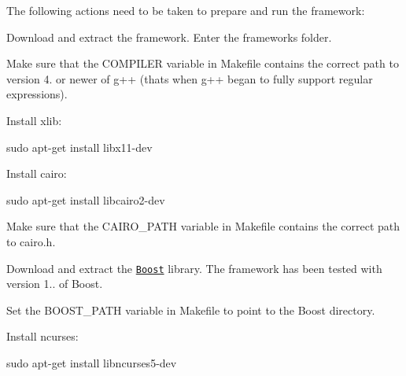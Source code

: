 The following actions need to be taken to prepare and run the framework\+:
\begin{DoxyEnumerate}
\item Download and extract the framework. Enter the framework\textquotesingle{}s folder.
\item Make sure that the {\ttfamily C\+O\+M\+P\+I\+L\+ER} variable in {\ttfamily Makefile} contains the correct path to version 4. or newer of {\ttfamily g++} (that\textquotesingle{}s when {\ttfamily g++} began to fully support regular expressions).
\item Install {\ttfamily xlib}\+: \begin{DoxyVerb}sudo apt-get install libx11-dev
\end{DoxyVerb}

\item Install {\ttfamily cairo}\+: \begin{DoxyVerb}sudo apt-get install libcairo2-dev
\end{DoxyVerb}

\item Make sure that the {\ttfamily C\+A\+I\+R\+O\+\_\+\+P\+A\+TH} variable in {\ttfamily Makefile} contains the correct path to {\ttfamily cairo.\+h}.
\item Download and extract the \href{http://www.boost.org/users/download/}{\tt Boost} library. The framework has been tested with version 1.. of Boost.
\item Set the {\ttfamily B\+O\+O\+S\+T\+\_\+\+P\+A\+TH} variable in {\ttfamily Makefile} to point to the {\ttfamily Boost} directory.
\item Install {\ttfamily ncurses}\+: \begin{DoxyVerb}sudo apt-get install libncurses5-dev
\end{DoxyVerb}

\end{DoxyEnumerate}

